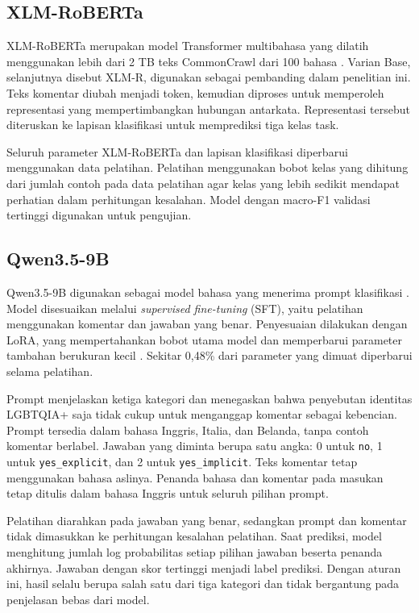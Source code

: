 \documentclass[11pt]{article}
\begin{document}
\subsection{XLM-RoBERTa}
XLM-RoBERTa merupakan model Transformer multibahasa yang dilatih menggunakan lebih dari 2 TB teks CommonCrawl dari 100 bahasa \citep{conneau-etal-2020-unsupervised}. Varian Base, selanjutnya disebut XLM-R, digunakan sebagai pembanding dalam penelitian ini. Teks komentar diubah menjadi token, kemudian diproses untuk memperoleh representasi yang mempertimbangkan hubungan antarkata. Representasi tersebut diteruskan ke lapisan klasifikasi untuk memprediksi tiga kelas task.

Seluruh parameter XLM-RoBERTa dan lapisan klasifikasi diperbarui menggunakan data pelatihan. Pelatihan menggunakan bobot kelas yang dihitung dari jumlah contoh pada data pelatihan agar kelas yang lebih sedikit mendapat perhatian dalam perhitungan kesalahan. Model dengan macro-F1 validasi tertinggi digunakan untuk pengujian.

\subsection{Qwen3.5-9B}
Qwen3.5-9B digunakan sebagai model bahasa yang menerima prompt klasifikasi \citep{qwen-team-2026-qwen35}. Model disesuaikan melalui \textit{supervised fine-tuning} (SFT), yaitu pelatihan menggunakan komentar dan jawaban yang benar. Penyesuaian dilakukan dengan LoRA, yang mempertahankan bobot utama model dan memperbarui parameter tambahan berukuran kecil \citep{hu-etal-2021-lora}. Sekitar 0,48\% dari parameter yang dimuat diperbarui selama pelatihan.

Prompt menjelaskan ketiga kategori dan menegaskan bahwa penyebutan identitas LGBTQIA+ saja tidak cukup untuk menganggap komentar sebagai kebencian. Prompt tersedia dalam bahasa Inggris, Italia, dan Belanda, tanpa contoh komentar berlabel. Jawaban yang diminta berupa satu angka: 0 untuk \texttt{no}, 1 untuk \texttt{yes\_explicit}, dan 2 untuk \texttt{yes\_implicit}. Teks komentar tetap menggunakan bahasa aslinya. Penanda bahasa dan komentar pada masukan tetap ditulis dalam bahasa Inggris untuk seluruh pilihan prompt.

Pelatihan diarahkan pada jawaban yang benar, sedangkan prompt dan komentar tidak dimasukkan ke perhitungan kesalahan pelatihan. Saat prediksi, model menghitung jumlah log probabilitas setiap pilihan jawaban beserta penanda akhirnya. Jawaban dengan skor tertinggi menjadi label prediksi. Dengan aturan ini, hasil selalu berupa salah satu dari tiga kategori dan tidak bergantung pada penjelasan bebas dari model.
\end{document}
